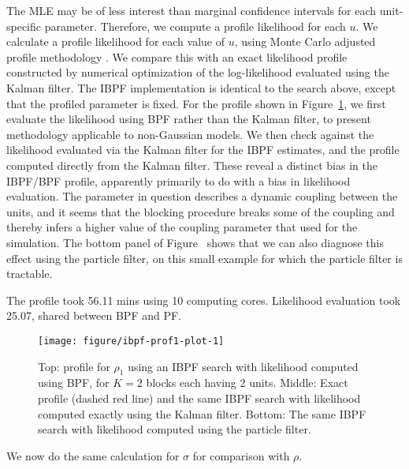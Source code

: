 \documentclass[12pt]{article}\usepackage[]{graphicx}\usepackage[]{xcolor}
\newenvironment{knitrout}{}{} %
\begin{document}
The MLE may be of less interest than marginal confidence intervals for each unit-specific parameter.
Therefore, we compute a profile likelihood for each $u$. 
We calculate a profile likelihood for each value of $u$, using Monte Carlo adjusted profile methodology \citep{ionides17,ning21}. 
We compare this with an exact likelihood profile constructed by numerical optimization of the log-likelihood evaluated using the Kalman filter.
The IBPF implementation is identical to the search above, except that the profiled parameter is fixed.
For the profile shown in Figure~\ref{fig:ibpf-prof1-plot}, we first evaluate the likelihood using BPF rather than the Kalman filter, to present methodology applicable to non-Gaussian models.
We then check against the likelihood evaluated via the Kalman filter for the IBPF estimates, and the profile computed directly from the Kalman filter.
These reveal a distinct bias in the IBPF/BPF profile, apparently primarily to do with a bias in likelihood evaluation.
The parameter in question describes a dynamic coupling between the units, and it seems that the blocking procedure breaks some of the coupling and thereby infers a higher value of the coupling parameter that used for the simulation.
The bottom panel of Figure~\label{fig:ibpf-prof1-plot} shows that we can also diagnose this effect using the particle filter, on this small example for which the particle filter is tractable.






The profile took 56.11 mins using 10 computing cores.
Likelihood evaluation took 25.07, shared between BPF and PF.

\begin{knitrout}
\color{fgcolor}\begin{figure}

\texttt{[image: figure/ibpf-prof1-plot-1]} \hfill{}

\caption[Top]{Top: profile for $\rho_1$ using an IBPF search with likelihood computed using BPF, for $K=2$ blocks each having 2 units. Middle: Exact profile (dashed red line) and the same IBPF search with likelihood computed exactly using the Kalman filter. Bottom: The same IBPF search with likelihood computed using the particle filter.}\label{fig:ibpf-prof1-plot}
\end{figure}

\end{knitrout}

We now do the same calculation for $\sigma$ for comparison with $\rho$.
\end{document}
